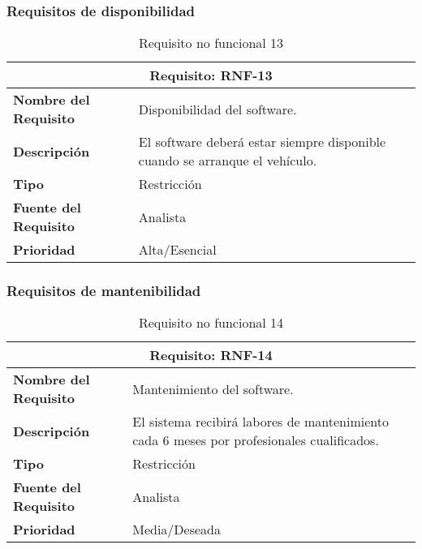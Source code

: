 \subsubsection{Requisitos de disponibilidad}

\begin{table}[H]
\begin{center}
\begin{tabular}{p{} p{7cm}}
\multicolumn{2}{c}{\textbf{Requisito: RNF-13} } \\
\hline \hline
\textbf{Nombre del Requisito} & Disponibilidad del software.\\
\hline
\textbf{Descripción} & El software deberá estar siempre disponible cuando se arranque el vehículo.\\
\hline
\textbf{Tipo} & Restricción  \\
\hline
\textbf{Fuente del Requisito} & Analista  \\
\hline
\textbf{Prioridad} & Alta/Esencial \\ \hline
\end{tabular}
\caption{Requisito no funcional 13}
\label{tab:RNF-13}
\end{center}
\end{table}


\subsubsection{Requisitos de mantenibilidad}

\begin{table}[H]
\begin{center}
\begin{tabular}{p{} p{7cm}}
\multicolumn{2}{c}{\textbf{Requisito: RNF-14} } \\
\hline \hline
\textbf{Nombre del Requisito} & Mantenimiento del software.\\
\hline
\textbf{Descripción} & El sistema recibirá labores de mantenimiento cada 6 meses por profesionales cualificados.\\
\hline
\textbf{Tipo} & Restricción  \\
\hline
\textbf{Fuente del Requisito} & Analista  \\
\hline
\textbf{Prioridad} & Media/Deseada \\ \hline
\end{tabular}
\caption{Requisito no funcional 14}
\label{tab:RNF-14}
\end{center}
\end{table}

